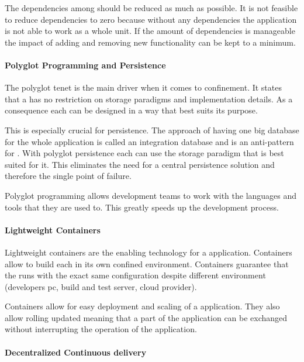 The dependencies among \mss{} should be reduced as much as possible. It is not
feasible to reduce dependencies to zero because without any dependencies the
application is not able to work as a whole unit. If the amount of dependencies
is manageable the impact of adding and removing new functionality can be kept
to a minimum.

\paragraph{Polyglot Programming and Persistence}

The polyglot tenet is the main driver when it comes to \ms{} confinement. It
states that a \ms{} has no restriction on storage paradigms and implementation
details. As a consequence each \ms{} can be designed in a way that best suits
its purpose.

This is especially crucial for persistence. The approach of having one big
database for the whole \ms{} application is called an integration database and
is an anti-pattern for \mss{}. With polyglot persistence each \ms{} can use the
storage paradigm that is best suited for it. This eliminates the need for a
central persistence solution and therefore the single point of failure.

Polyglot programming allows development teams to work with the languages and
tools that they are used to. This greatly speeds up the development process.

\paragraph{Lightweight Containers}

Lightweight containers are the enabling technology for a \ms{} application.
Containers allow to build each \ms{} in its own confined environment. Containers
guarantee that the \ms{} runs with the exact same configuration despite
different environment (developers pc, build and test server, cloud provider).

Containers allow for easy deployment and scaling of a \ms{} application. They
also allow rolling updated meaning that a part of the application can be
exchanged without interrupting the operation of the application.

\paragraph{Decentralized Continuous delivery}

